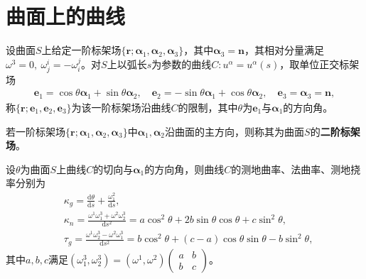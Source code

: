 \documentclass[../../main.tex]{subfiles}%
\begin{document}
\section{曲面上的曲线}

\begin{definition}
设曲面$S$上给定一阶标架场$\{\boldsymbol{r};\boldsymbol{\alpha}_1,\boldsymbol{\alpha}_2,\boldsymbol{\alpha}_3\}$，其中$\boldsymbol{\alpha}_3=\boldsymbol{n}$，其相对分量满足$\omega^3=0,\ \omega^i_j=-\omega^j_i$。对$S$上以弧长$s$为参数的曲线$C:u^\alpha=u^\alpha(s)$，取单位正交标架场
\begin{align*}
\boldsymbol{e}_1=\cos\theta\boldsymbol{\alpha}_1+\sin\theta\boldsymbol{\alpha}_2,\quad \boldsymbol{e}_2=-\sin\theta\boldsymbol{\alpha}_1+\cos\theta\boldsymbol{\alpha}_2,\quad \boldsymbol{e}_3=\boldsymbol{\alpha}_3=\boldsymbol{n},
\end{align*}
称$\{\boldsymbol{r};\boldsymbol{e}_1,\boldsymbol{e}_2,\boldsymbol{e}_3\}$为该一阶标架场沿曲线$C$的限制，其中$\theta$为$\boldsymbol{e}_1$与$\boldsymbol{\alpha}_1$的方向角。

若一阶标架场$\{\boldsymbol{r};\boldsymbol{\alpha}_1,\boldsymbol{\alpha}_2,\boldsymbol{\alpha}_3\}$中$\boldsymbol{\alpha}_1,\boldsymbol{\alpha}_2$沿曲面的主方向，则称其为曲面$S$的\textbf{二阶标架场}。
\end{definition}

\begin{proposition}
设$\theta$为曲面$S$上曲线$C$的切向与$\boldsymbol{\alpha}_1$的方向角，则曲线$C$的测地曲率、法曲率、测地挠率分别为
\begin{align}
&\kappa_g=\frac{\mathrm{d}\theta}{\mathrm{d}s}+\frac{\omega_1^2}{\mathrm{d}s},\label{eq:geodesic-curvature}\\
&\kappa_n=\frac{\omega^1\omega_1^3+\omega^2\omega_2^3}{\mathrm{d}s^2}=a\cos^2\theta+2b\sin\theta\cos\theta+c\sin^2\theta,\label{eq:normal-curvature}\\
&\tau_g=\frac{\omega^1\omega_2^3-\omega^2\omega_1^3}{\mathrm{d}s^2}=b\cos^2\theta+(c-a)\cos\theta\sin\theta-b\sin^2\theta,\label{eq:geodesic-torsion}
\end{align}
其中$a,b,c$满足$(\omega_1^3,\omega_2^3)=(\omega^1,\omega^2)\begin{pmatrix}a&b\\b&c\end{pmatrix}$。
\end{proposition}
\end{document}
